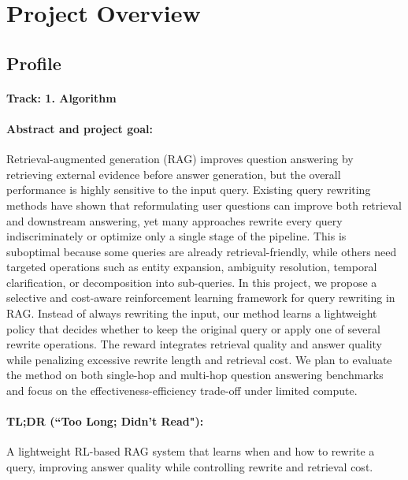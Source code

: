 \section{Project Overview}
\label{section:intro}

\subsection{Profile}

\paragraph{Track: 1. Algorithm}

\paragraph{Abstract and project goal:}
Retrieval-augmented generation (RAG) improves question answering by retrieving external evidence before answer generation, but the overall performance is highly sensitive to the input query. Existing query rewriting methods have shown that reformulating user questions can improve both retrieval and downstream answering, yet many approaches rewrite every query indiscriminately or optimize only a single stage of the pipeline. This is suboptimal because some queries are already retrieval-friendly, while others need targeted operations such as entity expansion, ambiguity resolution, temporal clarification, or decomposition into sub-queries. In this project, we propose a selective and cost-aware reinforcement learning framework for query rewriting in RAG. Instead of always rewriting the input, our method learns a lightweight policy that decides whether to keep the original query or apply one of several rewrite operations. The reward integrates retrieval quality and answer quality while penalizing excessive rewrite length and retrieval cost. We plan to evaluate the method on both single-hop and multi-hop question answering benchmarks and focus on the effectiveness-efficiency trade-off under limited compute.

\paragraph{TL;DR (``Too Long; Didn't Read"):}
A lightweight RL-based RAG system that learns when and how to rewrite a query, improving answer quality while controlling rewrite and retrieval cost.

